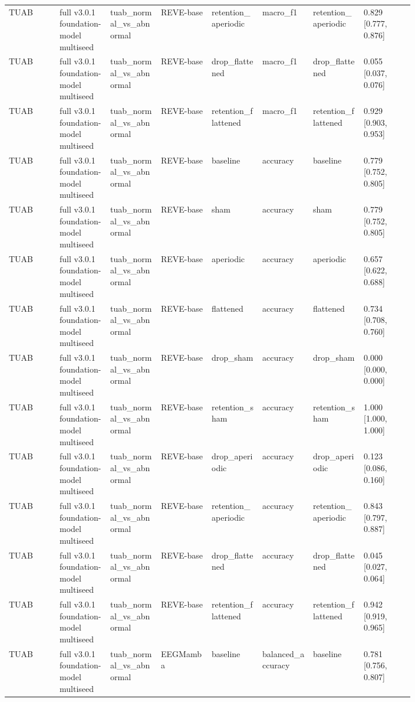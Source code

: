 \begin{longtable}{p{0.10\linewidth}p{0.10\linewidth}p{0.10\linewidth}p{0.10\linewidth}p{0.10\linewidth}p{0.10\linewidth}p{0.10\linewidth}p{0.10\linewidth}}
TUAB & full v3.0.1 foundation-model multiseed & tuab\_normal\_vs\_abnormal & REVE-base & retention\_aperiodic & macro\_f1 & retention\_aperiodic & 0.829 [0.777, 0.876]\\
TUAB & full v3.0.1 foundation-model multiseed & tuab\_normal\_vs\_abnormal & REVE-base & drop\_flattened & macro\_f1 & drop\_flattened & 0.055 [0.037, 0.076]\\
TUAB & full v3.0.1 foundation-model multiseed & tuab\_normal\_vs\_abnormal & REVE-base & retention\_flattened & macro\_f1 & retention\_flattened & 0.929 [0.903, 0.953]\\
TUAB & full v3.0.1 foundation-model multiseed & tuab\_normal\_vs\_abnormal & REVE-base & baseline & accuracy & baseline & 0.779 [0.752, 0.805]\\
TUAB & full v3.0.1 foundation-model multiseed & tuab\_normal\_vs\_abnormal & REVE-base & sham & accuracy & sham & 0.779 [0.752, 0.805]\\
TUAB & full v3.0.1 foundation-model multiseed & tuab\_normal\_vs\_abnormal & REVE-base & aperiodic & accuracy & aperiodic & 0.657 [0.622, 0.688]\\
TUAB & full v3.0.1 foundation-model multiseed & tuab\_normal\_vs\_abnormal & REVE-base & flattened & accuracy & flattened & 0.734 [0.708, 0.760]\\
TUAB & full v3.0.1 foundation-model multiseed & tuab\_normal\_vs\_abnormal & REVE-base & drop\_sham & accuracy & drop\_sham & 0.000 [0.000, 0.000]\\
TUAB & full v3.0.1 foundation-model multiseed & tuab\_normal\_vs\_abnormal & REVE-base & retention\_sham & accuracy & retention\_sham & 1.000 [1.000, 1.000]\\
TUAB & full v3.0.1 foundation-model multiseed & tuab\_normal\_vs\_abnormal & REVE-base & drop\_aperiodic & accuracy & drop\_aperiodic & 0.123 [0.086, 0.160]\\
TUAB & full v3.0.1 foundation-model multiseed & tuab\_normal\_vs\_abnormal & REVE-base & retention\_aperiodic & accuracy & retention\_aperiodic & 0.843 [0.797, 0.887]\\
TUAB & full v3.0.1 foundation-model multiseed & tuab\_normal\_vs\_abnormal & REVE-base & drop\_flattened & accuracy & drop\_flattened & 0.045 [0.027, 0.064]\\
TUAB & full v3.0.1 foundation-model multiseed & tuab\_normal\_vs\_abnormal & REVE-base & retention\_flattened & accuracy & retention\_flattened & 0.942 [0.919, 0.965]\\
TUAB & full v3.0.1 foundation-model multiseed & tuab\_normal\_vs\_abnormal & EEGMamba & baseline & balanced\_accuracy & baseline & 0.781 [0.756, 0.807]\\

\end{longtable}
